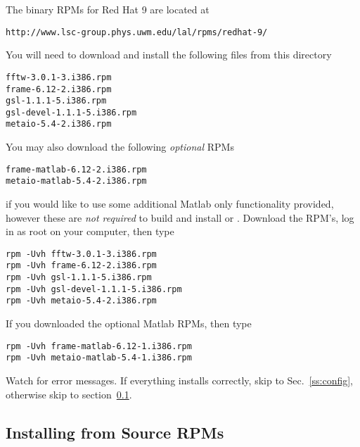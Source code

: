 The binary RPMs for Red Hat 9 are located at
\begin{verbatim}
http://www.lsc-group.phys.uwm.edu/lal/rpms/redhat-9/
\end{verbatim}
You will need to download and install the following files from this directory
\begin{verbatim}
fftw-3.0.1-3.i386.rpm
frame-6.12-2.i386.rpm
gsl-1.1.1-5.i386.rpm
gsl-devel-1.1.1-5.i386.rpm
metaio-5.4-2.i386.rpm
\end{verbatim}
You may also download the following \emph{optional} RPMs 
\begin{verbatim}
frame-matlab-6.12-2.i386.rpm
metaio-matlab-5.4-2.i386.rpm
\end{verbatim}
if you would like to use some additional Matlab only functionality provided,
however these are \emph{not required} to build and install \lal or \lalapps.
Download the RPM's, log in as root on your computer, then type
\begin{verbatim}
rpm -Uvh fftw-3.0.1-3.i386.rpm
rpm -Uvh frame-6.12-2.i386.rpm
rpm -Uvh gsl-1.1.1-5.i386.rpm
rpm -Uvh gsl-devel-1.1.1-5.i386.rpm
rpm -Uvh metaio-5.4-2.i386.rpm
\end{verbatim}
If you downloaded the optional Matlab RPMs, then type
\begin{verbatim}
rpm -Uvh frame-matlab-6.12-1.i386.rpm
rpm -Uvh metaio-matlab-5.4-1.i386.rpm
\end{verbatim}
Watch for error messages.   If everything installs correctly,  skip to
Sec.~\ref{ss:config}, otherwise skip to section~\ref{ss:srpm}.

\subsection{Installing from Source RPMs}
\label{ss:srpm}

